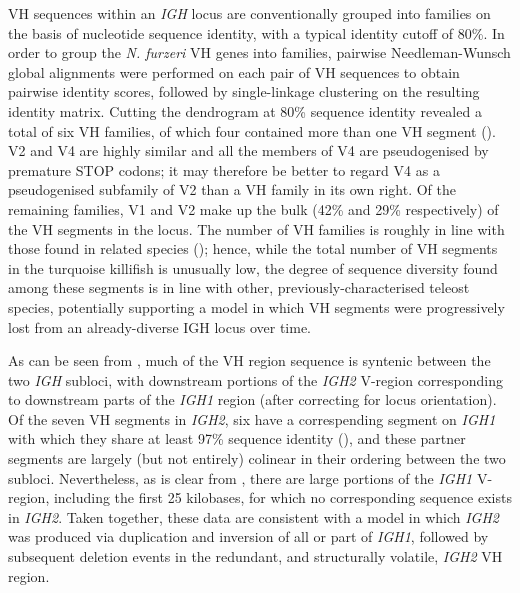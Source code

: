 	VH sequences within an \textit{IGH} locus are conventionally grouped into families on the basis of nucleotide sequence identity, with a typical identity cutoff of 80\%. In order to group the \textit{N. furzeri} VH genes into families, pairwise Needleman-Wunsch global alignments were performed on each pair of VH sequences to obtain pairwise identity scores, followed by single-linkage clustering on the resulting identity matrix. Cutting the dendrogram at 80\% sequence identity revealed a total of six VH families, of which four contained more than one VH segment (). 	V2 and V4 are highly similar and all the members of V4 are pseudogenised by premature STOP codons; it may therefore be better to regard V4 as a pseudogenised subfamily of V2 than a VH family in its own right. Of the remaining families, V1 and V2 make up the bulk (42\% and 29\% respectively) of the VH segments in the locus. The number of VH families is roughly in line with those found in related species (); hence, while the total number of VH segments in the turquoise killifish is unusually low, the degree of sequence diversity found among these segments is in line with other, previously-characterised teleost species, potentially supporting a model in which VH segments were progressively lost from an already-diverse IGH locus over time.
	
	As can be seen from , much of the VH region sequence is syntenic between the two \textit{IGH} subloci, with downstream portions of the \textit{IGH2} V-region corresponding to downstream parts of the \textit{IGH1} region (after correcting for locus orientation). Of the seven VH segments in \textit{IGH2}, six have a correspending segment on \textit{IGH1} with which they share at least 97\% sequence identity (), and these partner segments are largely (but not entirely) colinear in their ordering between the two subloci. Nevertheless, as is clear from , there are large portions of the \textit{IGH1} V-region, including the first 25 kilobases, for which no corresponding sequence exists in \textit{IGH2}. Taken together, these data are consistent with a model in which \textit{IGH2} was produced via duplication and inversion of all or part of \textit{IGH1}, followed by subsequent deletion events in the redundant, and structurally volatile, \textit{IGH2} VH region. %
	

